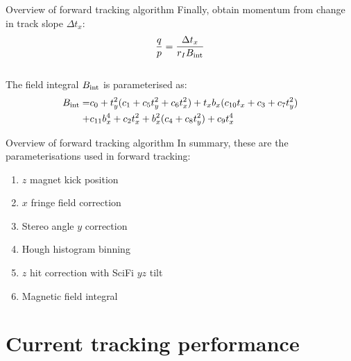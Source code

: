 \documentclass[xcolor={dvipsnames}]{beamer}
\begin{document}
\begin{frame}{Overview of forward tracking algorithm}
  \vspace{0.0cm}
  {\large Finally, obtain momentum from change in track slope $\Delta t_x$:}
  \vspace{0.2cm}
  \begin{equation*}
    \frac{q}{p} = \frac{\Delta t_x}{r_IB_{\rm int}}
  \end{equation*}
  \vspace{0.3cm}
  \\
  {\large The field integral $B_{\rm int}$ is parameterised as:}
  \begin{align*}
    B_{\rm int} =& c_0 + t_y^2(c_1 + c_5t_y^2 + c_6t_x^2) + t_xb_x(c_{10}t_x + c_3 + c_7t_y^2) \\
    +& c_{11}b_x^4 + c_2t_x^2 + b_x^2(c_4 + c_8t_y^2) + c_9t_x^4
  \end{align*}
\end{frame}

\begin{frame}{Overview of forward tracking algorithm}
  \vspace{0.0cm}
  {\large In summary, these are the parameterisations used in forward tracking:}
  \vspace{0.2cm}
  \begin{enumerate}
    \setlength\itemsep{0.5em}
    \item{$z$ magnet kick position}
    \item{$x$ fringe field correction}
    \item{Stereo angle $y$ correction}
    \item{Hough histogram binning}
    \item{$z$ hit correction with SciFi $yz$ tilt}
    \item{Magnetic field integral}
  \end{enumerate}
\end{frame}

\section{Current tracking performance}
\end{document}
